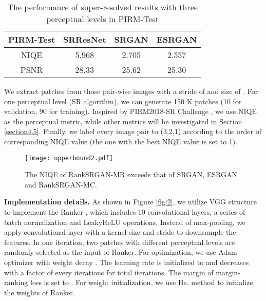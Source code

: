 \documentclass[10pt,twocolumn,letterpaper]{article}
\begin{document}
\begin{table}[!ht]
\small \setlength{\abovecaptionskip}{-3pt}
\setlength{\belowcaptionskip}{-10pt}
\begin{center}
\begin{tabular}{c|ccc}
\hline\hline
PIRM-Test & SRResNet & SRGAN & ESRGAN \\
\hline
NIQE & 5.968 & 2.705 & 2.557\\
PSNR & 28.33 & 25.62 & 25.30\\
\hline
\end{tabular}
\end{center}
\caption{The performance of super-resolved results with three perceptual levels in PIRM-Test \cite{blau20182018}}
\label{table:1}
\vskip -0.1cm
\end{table}
We extract patches from those pair-wise images with a stride of  and size of . For one perceptual level (SR algorithm), we can generate 150 K patches (10 for validation, 90 for training). Inspired by PIRM2018-SR Challenge \cite{blau20182018}, we use NIQE \cite{mittal2013making} as the perceptual metric, while other metrics will be investigated in Section \ref{section4.5}. Finally, we label every image pair to (3,2,1) according to the order of corresponding NIQE value (the one with the best NIQE value is set to 1).
\begin{figure}[t]
\setlength{\abovecaptionskip}{-0.1cm}
\setlength{\belowcaptionskip}{-0.6cm}
\begin{center}
	\texttt{[image: upperbound2.pdf]} 

\end{center}
   \caption{The NIQE of RankSRGAN-MR exceeds that of SRGAN, ESRGAN and RankSRGAN-MC.}
\label{fig:5}
\end{figure}

\textbf{Implementation details.} As shown in Figure \ref{fig:2}, we  utilize VGG \cite{simonyan2014very} structure to implement the Ranker \cite{liu2017rankiqa}, which includes 10 convolutional layers, a series of batch normalization and LeakyReLU operations. Instead of max-pooling, we apply convolutional layer with a kernel size  and stride  to downsample the features. In one iteration, two patches with different perceptual levels are randomly selected as the input of Ranker. 
For optimization, we use Adam \cite{kingma2014adam} optimizer with weight decay . The learning rate is initialized to  and decreases with a factor  of every  iterations for total  iterations. The margin  of margin-ranking loss is set to . For weight initialization, we use He. \cite{he2015delving} method to initialize the weights of Ranker. 
\end{document}
